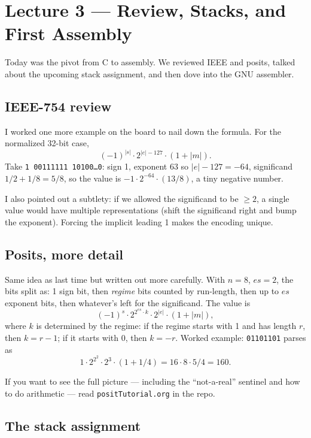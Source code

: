 \documentclass[11pt]{article}
\begin{document}
\section{Lecture 3 --- Review, Stacks, and First Assembly}

Today was the pivot from C to assembly. We reviewed IEEE and posits,
talked about the upcoming stack assignment, and then dove into the
GNU assembler.

\subsection*{IEEE-754 review}

I worked one more example on the board to nail down the formula. For
the normalized 32-bit case,
\[
  (-1)^{|s|} \cdot 2^{|e| - 127} \cdot (1 + |m|).
\]
Take \texttt{1 00111111 10100\ldots0}: sign 1, exponent $63$ so
$|e| - 127 = -64$, significand $1/2 + 1/8 = 5/8$, so the value is
$-1 \cdot 2^{-64} \cdot (13/8)$, a tiny negative number.

I also pointed out a subtlety: if we allowed the significand to be
$\ge 2$, a single value would have multiple representations
(shift the significand right and bump the exponent). Forcing the
implicit leading 1 makes the encoding unique.

\subsection*{Posits, more detail}

Same idea as last time but written out more carefully. With $n = 8$,
$es = 2$, the bits split as: 1 sign bit, then \emph{regime} bits
counted by run-length, then up to $es$ exponent bits, then whatever's
left for the significand. The value is
\[
  (-1)^s \cdot 2^{2^{es} \cdot k} \cdot 2^{|e|} \cdot (1 + |m|),
\]
where $k$ is determined by the regime: if the regime starts with 1
and has length $r$, then $k = r - 1$; if it starts with 0, then
$k = -r$. Worked example: \texttt{01101101} parses as
\[
  1 \cdot 2^{2^2} \cdot 2^3 \cdot (1 + 1/4)
  = 16 \cdot 8 \cdot 5/4 = 160.
\]

If you want to see the full picture --- including the
``not-a-real'' sentinel and how to do arithmetic --- read
\texttt{positTutorial.org} in the repo.

\subsection*{The stack assignment}
\end{document}
